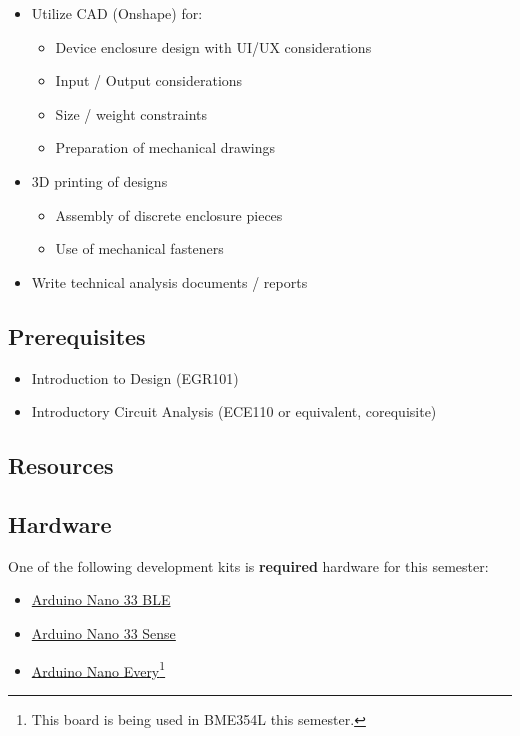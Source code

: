 \documentclass[10pt]{report}
\begin{document}
\begin{itemize}
\begin{itemize}
    \end{itemize}
    \item Utilize CAD (Onshape) for:
    \begin{itemize}
        \item Device enclosure design with UI/UX considerations
        \item Input / Output considerations
        \item Size / weight constraints
        \item Preparation of mechanical drawings
    \end{itemize}
    \item 3D printing of designs
    \begin{itemize}
        \item Assembly of discrete enclosure pieces
        \item Use of mechanical fasteners
    \end{itemize}
    \item Write technical analysis documents / reports
\end{itemize}


\subsection*{Prerequisites}
\begin{itemize}
    \item Introduction to Design (EGR101)
    \item Introductory Circuit Analysis (ECE110 or equivalent, corequisite)
\end{itemize}

\subsection*{Resources}
\subsection*{Hardware}
One of the following development kits is \textbf{required} hardware for this semester:
\begin{itemize}
    \item \href{https://store-usa.arduino.cc/products/arduino-nano-33-ble?selectedStore=us}{Arduino Nano 33 BLE} 
    \item \href{https://store-usa.arduino.cc/products/arduino-nano-33-ble-sense?selectedStore=us}{Arduino Nano 33 Sense}
    \item \href{https://store-usa.arduino.cc/products/arduino-nano-every-with-headers?selectedStore=us}{Arduino
    Nano Every}\footnote{This board is being used in BME354L this semester.}
\end{itemize}
\end{document}
